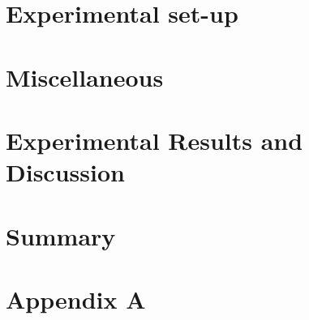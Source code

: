 \documentclass[a4paper,12pt,twoside]{report}
\begin{document}
\chapter{Experimental set-up}\label{chapter:Experimental set-up and Results}


\chapter{Miscellaneous}\label{chapter:Miscellaneous}

 
\chapter{Experimental Results and Discussion}\label{chapter:Results and discussion}



\chapter{Summary}\label{chapter:Summary}




\newpage

\appendix
{}
\chapter{Appendix A}\label{chapter:Appendix A}

\end{document}
